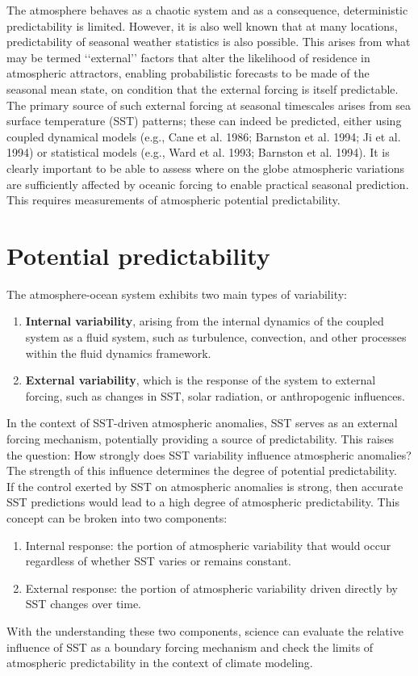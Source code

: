 The atmosphere behaves as a chaotic system and as a consequence, deterministic predictability is limited.
However, it is also well known that at many locations, predictability of seasonal weather statistics is also
possible. This arises from what may be termed ‘‘external’’ factors that alter the likelihood of residence in
atmospheric attractors, enabling probabilistic forecasts to be made of the seasonal mean state, on
condition that the external forcing is itself predictable.
The primary source of such external forcing at seasonal timescales arises from sea surface temperature
(SST) patterns; these can indeed be predicted, either using coupled dynamical models (e.g., Cane et al.
1986; Barnston et al. 1994; Ji et al. 1994) or statistical models (e.g., Ward et al. 1993; Barnston et al. 1994).
It is clearly important to be able to assess where on the globe atmospheric variations are sufficiently
affected by oceanic forcing to enable practical seasonal prediction. This requires measurements of
atmospheric potential predictability.

\section{Potential predictability} The atmosphere-ocean system exhibits two main types of variability:
\begin{enumerate}
	\item \textbf{Internal variability}, arising from the internal dynamics of the coupled system as a fluid system, such as turbulence, convection, and other processes within the fluid dynamics framework.
	\item \textbf{External variability}, which is the response of the system to external forcing, such as changes in SST, solar radiation, or anthropogenic influences.
\end{enumerate}
In the context of SST-driven atmospheric anomalies, SST serves as an external forcing mechanism, potentially providing a source of predictability. This raises the question: How strongly does SST variability influence atmospheric anomalies? The strength of this influence determines the degree of potential predictability.\\

If the control exerted by SST on atmospheric anomalies is strong, then accurate SST predictions would lead to a high degree of atmospheric predictability. This concept can be broken into two components:
\begin{enumerate}
	\item Internal response: the portion of atmospheric variability that would occur regardless of whether SST varies or remains constant.
	\item External response: the portion of atmospheric variability driven directly by SST changes over time.
\end{enumerate}
With the understanding these two components, science can evaluate the relative influence of SST as a boundary forcing mechanism and check the limits of atmospheric predictability in the context of climate modeling. \\


